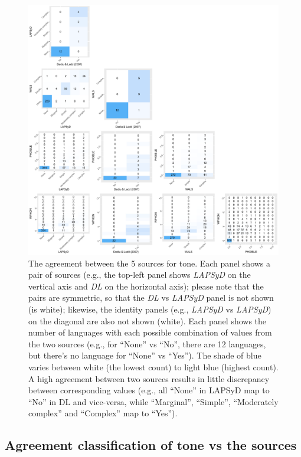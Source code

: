 \documentclass[twoside,onecolumn]{article}
\begin{document}
\begin{figure}[h]
  \centering
  \includegraphics[width=\textwidth]{../../code/figures/tone_agreement_sources}
  \caption{The agreement between the 5 sources for tone. Each panel shows a pair of sources (e.g., the top-left panel shows \textit{LAPSyD} on the vertical axis and \textit{DL} on the horizontal axis); please note that the pairs are symmetric, so that the \textit{DL} vs \textit{LAPSyD} panel is not shown (is white); likewise, the identity panels (e.g., \textit{LAPSyD} vs \textit{LAPSyD}) on the diagonal are also not shown (white). Each panel shows the number of languages with each possible combination of values from the two sources (e.g., for ``None'' vs ``No'', there are 12 languages, but there's no language for ``None'' vs ``Yes''). The shade of blue varies between white (the lowest count) to light blue (highest count). A high agreement between two sources results in little discrepancy between corresponding values (e.g., all ``None'' in LAPSyD map to ``No'' in DL and vice-versa, while ``Marginal'', ``Simple'', ``Moderately complex'' and ``Complex'' map to ``Yes'').}
  \label{Fig:tone_agreement_sources}
\end{figure}


\subsection{Agreement classification of tone vs the sources} \label{SM:tone_agreeemnt_with_sources}
\end{document}
